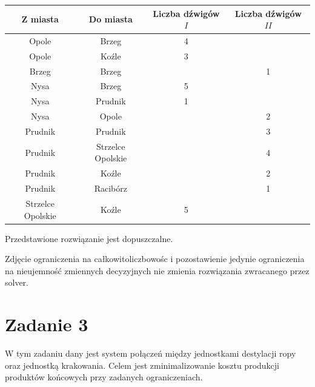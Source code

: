 \documentclass[12pt]{article}
\begin{document}
\begin{table}[H]
    \centering
    \begin{tabular}{|c|c||c|c|}
        \hline
        Z miasta & Do miasta & Liczba dźwigów $I$ & Liczba dźwigów $II$ \\
        \hline
        Opole & Brzeg & 4 &  \\
        Opole & Koźle & 3 &  \\
        Brzeg & Brzeg &  & 1 \\
        Nysa & Brzeg & 5 &  \\
        Nysa & Prudnik & 1 &  \\
        Nysa & Opole &  & 2 \\
        Prudnik & Prudnik &  & 3 \\
        Prudnik & Strzelce Opolskie &  & 4 \\
        Prudnik & Koźle &  & 2 \\
        Prudnik & Racibórz &  & 1 \\
        Strzelce Opolskie & Koźle & 5 &  \\
        \hline
    \end{tabular}
\end{table}

Przedstawione rozwiązanie jest dopuszczalne.

Zdjęcie ograniczenia na całkowitoliczbowośc i pozostawienie jedynie ograniczenia na nieujemność zmiennych decyzyjnych nie zmienia rozwiązania zwracanego przez solver.

\section*{Zadanie 3}

W tym zadaniu dany jest system połączeń między jednostkami destylacji ropy oraz jednostką krakowania. Celem jest zminimalizowanie kosztu produkcji produktów końcowych przy zadanych ograniczeniach.
\end{document}
